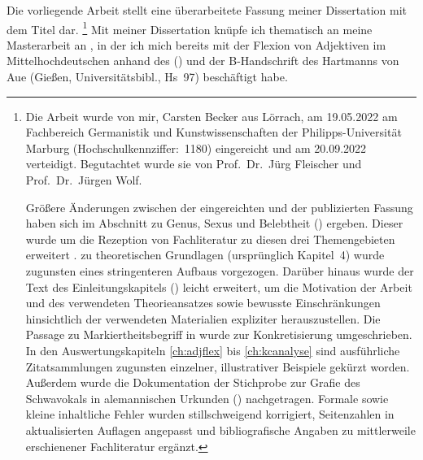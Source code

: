 \addchap{\lsPrefaceTitle}

Die vorliegende Arbeit stellt eine überarbeitete Fassung meiner Dissertation
mit dem Titel  dar.%
%
	\footnote{Die Arbeit wurde von mir, Carsten Becker aus Lörrach, am
		19.05.2022 am Fachbereich Germanistik und Kunstwissenschaften der
		Philipps-Universität Marburg (Hochschulkennziffer:~1180) eingereicht
		und am 20.09.2022 verteidigt. Begutachtet wurde sie von Prof.~Dr.~Jürg
		Fleischer und Prof.~Dr.~Jürgen Wolf.

		Größere Änderungen zwischen der eingereichten und der publizierten
		Fassung haben sich im Abschnitt zu Genus, Sexus und Belebtheit
		() ergeben. Dieser wurde um die Rezeption von
		Fachliteratur zu diesen drei Themengebieten erweitert%
		.  zu theoretischen Grundlagen (ursprünglich
		Kapitel~4) wurde zugunsten eines stringenteren Aufbaus vorgezogen.
		Darüber hinaus wurde der Text des Einleitungskapitels
		() leicht erweitert, um die Motivation der
		Arbeit und des verwendeten Theorieansatzes sowie bewusste
		Einschränkungen hinsichtlich der verwendeten Materialien expliziter
		herauszustellen. Die Passage zu 
		Markiertheitsbegriff in  wurde zur
		Konkretisierung umgeschrieben. In den Aus\-wertungs\-kapi\-teln
		\ref{ch:adjflex} bis \ref{ch:kcanalyse} sind ausführliche
		Zitatsammlungen zugunsten einzelner, illustrativer Beispiele gekürzt
		worden. Außerdem wurde die Dokumentation der Stich\-probe zur Grafie
		des Schwa\-vokals in alemannischen Urkunden
		() nachgetragen. Formale sowie kleine
		inhaltliche Fehler wurden stillschweigend korrigiert, Sei\-ten\-zahlen
		in aktualisierten Auflagen angepasst und bibliografische Angaben zu
		mittlerweile erschienener Fachliteratur ergänzt. }
%
Mit meiner Dissertation knüpfe ich thematisch an meine Masterarbeit an
\autocite{becker2016}, in der ich mich bereits mit der Flexion von Adjektiven
im Mittelhochdeutschen anhand des  (\CAO) und der B-Handschrift des  Hartmanns von
Aue (Gießen, Universitätsbibl., Hs~97) beschäftigt habe.

